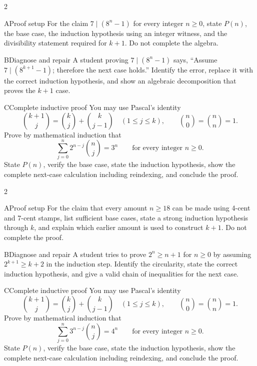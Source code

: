 \documentclass[9pt]{extarticle}
\begin{document}
\CoreWorkArea
\FormBreak
{}
\begin{multicols}{2}
\begin{CompactCoreProblem}{A}{Proof setup}
For the claim $7\mid(8^n-1)$ for every integer $n\ge0$, state $P(n)$, the base case, the induction hypothesis using an integer witness, and the divisibility statement required for $k+1$. Do not complete the algebra.
\end{CompactCoreProblem}
\begin{CompactCoreProblem}{B}{Diagnose and repair}
A student proving $7\mid(8^n-1)$ says, “Assume $7\mid(8^{k+1}-1)$; therefore the next case holds.” Identify the error, replace it with the correct induction hypothesis, and show an algebraic decomposition that proves the $k+1$ case.
\end{CompactCoreProblem}
\end{multicols}
\begin{CompactCoreProblem}{C}{Complete inductive proof}
You may use Pascal's identity
\[
\binom{k+1}{j}=\binom{k}{j}+\binom{k}{j-1}
\quad(1\le j\le k),\qquad
\binom{n}{0}=\binom{n}{n}=1.
\]
Prove by mathematical induction that
\[
\sum_{j=0}^{n} 2^{n-j}\binom{n}{j}=3^n\qquad\text{for every integer }n\ge0.
\]
State $P(n)$, verify the base case, state the induction hypothesis, show the complete next-case calculation including reindexing, and conclude the proof.
\end{CompactCoreProblem}
\CoreWorkArea
\FormBreak
{}
\begin{multicols}{2}
\begin{CompactCoreProblem}{A}{Proof setup}
For the claim that every amount $n\ge18$ can be made using 4-cent and 7-cent stamps, list sufficient base cases, state a strong induction hypothesis through $k$, and explain which earlier amount is used to construct $k+1$. Do not complete the proof.
\end{CompactCoreProblem}
\begin{CompactCoreProblem}{B}{Diagnose and repair}
A student tries to prove $2^n\ge n+1$ for $n\ge0$ by assuming $2^{k+1}\ge k+2$ in the induction step. Identify the circularity, state the correct induction hypothesis, and give a valid chain of inequalities for the next case.
\end{CompactCoreProblem}
\end{multicols}
\begin{CompactCoreProblem}{C}{Complete inductive proof}
You may use Pascal's identity
\[
\binom{k+1}{j}=\binom{k}{j}+\binom{k}{j-1}
\quad(1\le j\le k),\qquad
\binom{n}{0}=\binom{n}{n}=1.
\]
Prove by mathematical induction that
\[
\sum_{j=0}^{n} 3^{n-j}\binom{n}{j}=4^n\qquad\text{for every integer }n\ge0.
\]
State $P(n)$, verify the base case, state the induction hypothesis, show the complete next-case calculation including reindexing, and conclude the proof.
\end{CompactCoreProblem}
\end{document}
